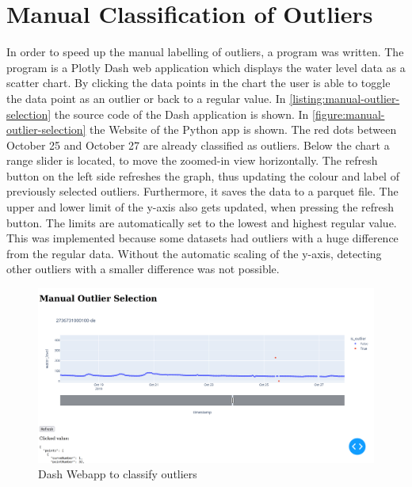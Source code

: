 \section{Manual Classification of Outliers}
In order to speed up the manual labelling of outliers, a program was written. The program is a Plotly Dash \cite{DashDocumentationUser} web application which displays the water level data as a scatter chart. 
By clicking the data points in the chart the user is able to toggle the data point as an outlier or back to a regular value. 
In \autoref{listing:manual-outlier-selection} the source code of the Dash application is shown. 
In \autoref{figure:manual-outlier-selection} the Website of the Python app is shown. The red dots between October 25 and October 27 are already classified as outliers. Below the chart a range slider is located, to move the zoomed-in view horizontally. 
The refresh button on the left side refreshes the graph, thus updating the colour and label of previously selected outliers. Furthermore, it saves the data to a parquet file.
The upper and lower limit of the y-axis also gets updated, when pressing the refresh button. 
The limits are automatically set to the lowest and highest regular value. 
This was implemented because some datasets had outliers with a huge difference from the regular data. 
Without the automatic scaling of the y-axis, detecting other outliers with a smaller difference was not possible.
\begin{figure}[H]
    \centering
    \includegraphics[width=\textwidth]{./pics/manual-outlier-selection.png}
    \caption{Dash Webapp to classify outliers}
    \label{figure:manual-outlier-selection}
\end{figure}

